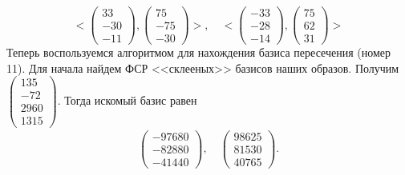 $$<\begin{pmatrix}
    33\\-30\\-11
\end{pmatrix},
\begin{pmatrix}
    75\\-75\\-30
\end{pmatrix}>, \quad
<\begin{pmatrix}
    -33\\-28\\-14
\end{pmatrix},
\begin{pmatrix}
    75\\62\\31
\end{pmatrix}>$$
Теперь воспользуемся алгоритмом для нахождения базиса пересечения (номер 11). Для начала найдем ФСР <<склееных>> базисов наших образов. Получим $\begin{pmatrix}
    135\\-72\\2960\\1315
\end{pmatrix}$. Тогда искомый базис равен
\begin{gather*}
    \begin{pmatrix}
        -97680\\-82880\\-41440
    \end{pmatrix},\quad
    \begin{pmatrix}
        98625\\81530\\40765
    \end{pmatrix}.
\end{gather*}\\

